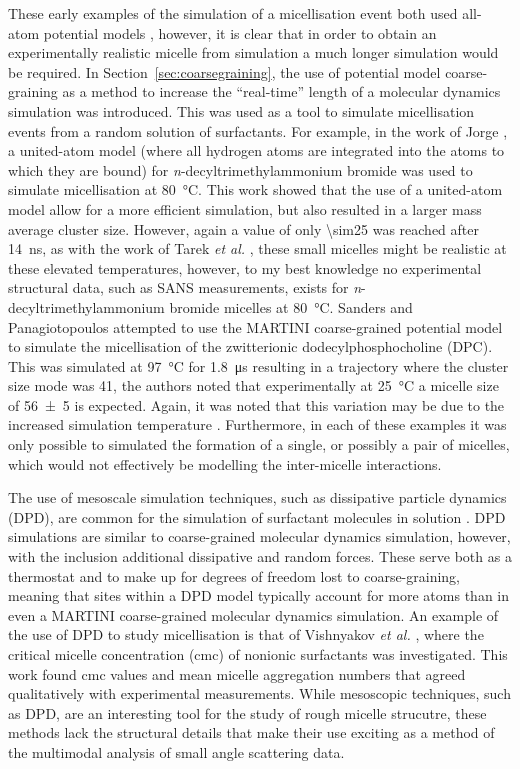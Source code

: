 These early examples of the simulation of a micellisation event both used all-atom potential models \cite{tarek_molecular_1998,maillet_large_1999}, however, it is clear that in order to obtain an experimentally realistic micelle from simulation a much longer simulation would be required.
In Section~\ref{sec:coarsegraining}, the use of potential model coarse-graining as a method to increase the ``real-time'' length of a molecular dynamics simulation was introduced.
This was used as a tool to simulate micellisation events from a random solution of surfactants.
For example, in the work of Jorge \cite{jorge_molecular_2008}, a united-atom model (where all hydrogen atoms are integrated into the atoms to which they are bound) for \emph{n}-decyltrimethylammonium bromide was used to simulate micellisation at \SI{80}{\celsius}.
This work showed that the use of a united-atom model allow for a more efficient simulation, but also resulted in a larger mass average cluster size.
However, again a value of only \num{\sim25} was reached after \SI{14}{\nano\second}, as with the work of Tarek \emph{et al.} \cite{tarek_molecular_1998}, these small micelles might be realistic at these elevated temperatures, however, to my best knowledge no experimental structural data, such as SANS measurements, exists for \emph{n}-decyltrimethylammonium bromide micelles at \SI{80}{\celsius}.
Sanders and Panagiotopoulos attempted to use the MARTINI coarse-grained potential model to simulate the micellisation of the zwitterionic dodecylphosphocholine (DPC).
This was simulated at \SI{97}{\celsius} for \SI{1.8}{\micro\second} resulting in a trajectory where the cluster size mode was 41, the authors noted that experimentally at \SI{25}{\celsius} a micelle size of \num{56\pm5} is expected.
Again, it was noted that this variation may be due to the increased simulation temperature \cite{malliaris_temperature_1985,kamenka_aqueous_1995}.
Furthermore, in each of these examples it was only possible to simulated the formation of a single, or possibly a pair of micelles, which would not effectively be modelling the inter-micelle interactions.

The use of mesoscale simulation techniques, such as dissipative particle dynamics (DPD), are common for the simulation of surfactant molecules in solution \cite{shelley_computer_2000}.
DPD simulations are similar to coarse-grained molecular dynamics simulation, however, with the inclusion additional dissipative and random forces.
These serve both as a thermostat and to make up for degrees of freedom lost to coarse-graining, meaning that sites within a DPD model typically account for more atoms than in even a MARTINI coarse-grained molecular dynamics simulation.
An example of the use of DPD to study micellisation is that of Vishnyakov \emph{et al.} \cite{vishnyakov_prediction_2013}, where the critical micelle concentration (cmc) of nonionic surfactants was investigated.
This work found cmc values and mean micelle aggregation numbers that agreed qualitatively with experimental measurements.
While mesoscopic techniques, such as DPD, are an interesting tool for the study of rough micelle strucutre, these methods lack the structural details that make their use exciting as a method of the multimodal analysis of small angle scattering data.

